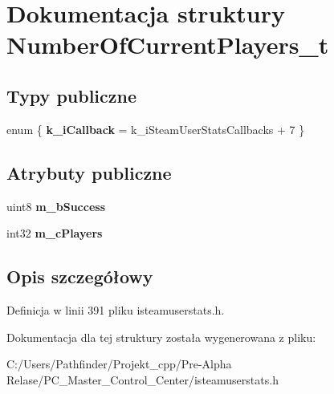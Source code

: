 \hypertarget{struct_number_of_current_players__t}{}\section{Dokumentacja struktury Number\+Of\+Current\+Players\+\_\+t}
\label{struct_number_of_current_players__t}
\subsection*{Typy publiczne}
\begin{DoxyCompactItemize}
\item 
\mbox{\label{struct_number_of_current_players__t_a0f55f79255cd60383ff7683e275af8a7}} 
enum \{ {\bfseries k\+\_\+i\+Callback} = k\+\_\+i\+Steam\+User\+Stats\+Callbacks + 7
 \}
\end{DoxyCompactItemize}
\subsection*{Atrybuty publiczne}
\begin{DoxyCompactItemize}
\item 
\mbox{\label{struct_number_of_current_players__t_a57ca566550ecbb229dd13e47ce580ffd}} 
uint8 {\bfseries m\+\_\+b\+Success}
\item 
\mbox{\label{struct_number_of_current_players__t_a6c951e24d669dcacc9316a76f03504d7}} 
int32 {\bfseries m\+\_\+c\+Players}
\end{DoxyCompactItemize}


\subsection{Opis szczegółowy}


Definicja w linii 391 pliku isteamuserstats.\+h.



Dokumentacja dla tej struktury została wygenerowana z pliku\+:\begin{DoxyCompactItemize}
\item 
C\+:/\+Users/\+Pathfinder/\+Projekt\+\_\+cpp/\+Pre-\/\+Alpha Relase/\+P\+C\+\_\+\+Master\+\_\+\+Control\+\_\+\+Center/isteamuserstats.\+h\end{DoxyCompactItemize}

